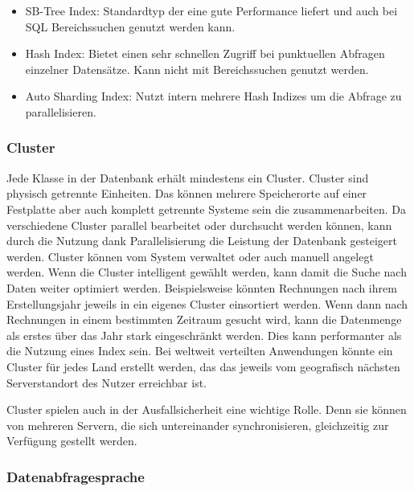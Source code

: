 \begin{itemize}
    \item SB-Tree Index: Standardtyp der eine gute Performance liefert und auch bei \gls{SQL} Bereichssuchen genutzt werden kann.
    \item Hash Index: Bietet einen sehr schnellen Zugriff bei punktuellen Abfragen einzelner Datensätze. Kann nicht mit Bereichssuchen genutzt werden.
    \item Auto Sharding Index: Nutzt intern mehrere Hash Indizes um die Abfrage zu parallelisieren.
\end{itemize}

\subsubsection{Cluster}


Jede Klasse in der Datenbank erhält mindestens ein Cluster. Cluster sind physisch getrennte Einheiten. Das können mehrere Speicherorte auf einer Festplatte aber auch komplett getrennte Systeme sein die zusammenarbeiten. Da verschiedene Cluster parallel bearbeitet oder durchsucht werden können, kann durch die Nutzung dank Parallelisierung die Leistung der Datenbank gesteigert werden. Cluster können vom System verwaltet oder auch manuell angelegt werden. Wenn die Cluster intelligent gewählt werden, kann damit die Suche nach Daten weiter optimiert werden. Beispielsweise könnten Rechnungen nach ihrem Erstellungsjahr jeweils in ein eigenes Cluster einsortiert werden. Wenn dann nach Rechnungen in einem bestimmten Zeitraum gesucht wird, kann die Datenmenge als erstes über das Jahr stark eingeschränkt werden. Dies kann performanter als die Nutzung eines Index sein. Bei weltweit verteilten Anwendungen könnte ein Cluster für jedes Land erstellt werden, das das jeweils vom geografisch nächsten Serverstandort des Nutzer erreichbar ist.

Cluster spielen auch in der Ausfallsicherheit eine wichtige Rolle. Denn sie können von mehreren Servern, die sich untereinander synchronisieren, gleichzeitig zur Verfügung gestellt werden.

\subsubsection{Datenabfragesprache}

